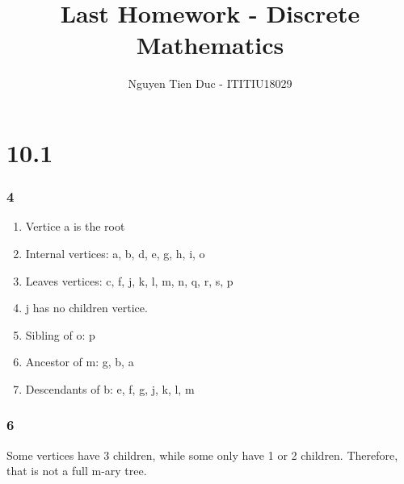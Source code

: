 \documentclass[12pt]{article}
\begin{document}
  \title{Last Homework - Discrete Mathematics}
  \author{Nguyen Tien Duc - ITITIU18029}
  \maketitle

  \part*{10.1}
    \section*{4}
      \begin{enumerate}[label=\alph*)]
        \item Vertice a is the root
        \item Internal vertices: a, b, d, e, g, h, i, o
        \item Leaves vertices: c, f, j, k, l, m, n, q, r, s, p
        \item j has no children vertice.
        \item Sibling of o: p
        \item Ancestor of m: g, b, a
        \item Descendants of b: e, f, g, j, k, l, m
      \end{enumerate}
    \section*{6}
      Some vertices have 3 children, while some only have 1 or 2 children. Therefore, that is not a full m-ary tree.
\end{document}
